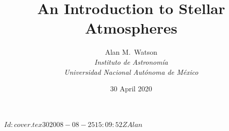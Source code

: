
\svnInfo $Id: cover.tex 30 2008-08-25 15:09:52Z Alan $

\date{30 April 2020}

\title{\Huge\bfseries An Introduction to Stellar Atmospheres}

\author{
\Large Alan M.\ Watson\\[0.5\baselineskip]
\Large \itshape Instituto de Astronomía\\[0.2\baselineskip]
\Large \itshape Universidad Nacional Autónoma de México
}

\maketitle


